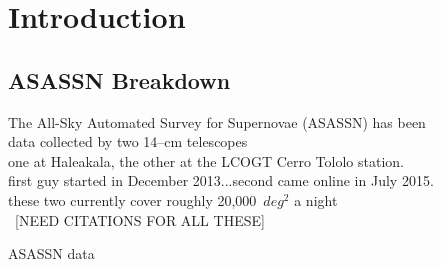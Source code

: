 \documentclass[aps,prb,twocolumn,superscriptaddress]{revtex4-1}
\begin{document}
\clearpage


\section{Introduction}



\subsection{ASASSN Breakdown}
The All-Sky Automated Survey for Supernovae (ASASSN) has been\\
data collected by two 14--cm telescopes\\
one at Haleakala, the other at the LCOGT Cerro Tololo station.\\
first guy started in December 2013...second came online in July 2015.\\
these two currently cover roughly 20,000~$deg^{2}$ a night\\
~[NEED CITATIONS FOR ALL THESE]

ASASSN data~\cite{asn_data}
\end{document}
